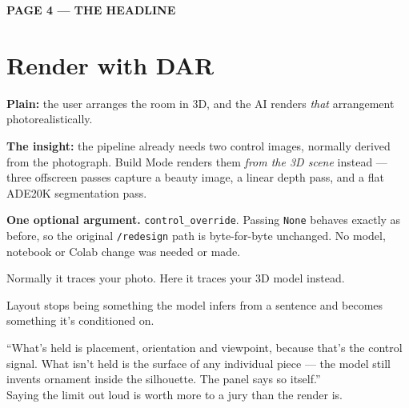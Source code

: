 \documentclass[10.5pt,a4paper]{article}
\newcommand{\pagelabel}[2]{%
  {\sffamily\bfseries\scriptsize\color{brass}\MakeUppercase{Page #1 --- #2}}\par\vspace{0.2em}}
\begin{document}
\newpage
\pagelabel{4}{the headline}
\section*{Render with DAR}

\textbf{Plain:} the user arranges the room in 3D, and the AI renders \emph{that} arrangement
photorealistically.

\textbf{The insight:} the pipeline already needs two control images, normally derived from the
photograph. Build Mode renders them \emph{from the 3D scene} instead --- three offscreen passes
capture a beauty image, a linear depth pass, and a flat ADE20K segmentation pass.

\textbf{One optional argument.} \texttt{control\_override}. Passing \texttt{None} behaves exactly as
before, so the original \texttt{/redesign} path is byte-for-byte unchanged. No model, notebook or
Colab change was needed or made.

\begin{sayit}
Normally it traces your photo. Here it traces your 3D model instead.
\end{sayit}
\begin{sayit}
Layout stops being something the model infers from a sentence and becomes something it's
conditioned on.
\end{sayit}

\begin{avoid}
``What's held is placement, orientation and viewpoint, because that's the control signal. What isn't
held is the surface of any individual piece --- the model still invents ornament inside the
silhouette. The panel says so itself.''\\[2pt]
Saying the limit out loud is worth more to a jury than the render is.
\end{avoid}
\end{document}
